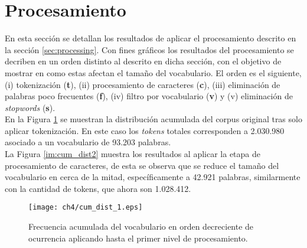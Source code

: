 \documentclass[letterpaper,12pt,oneside]{book} %
\begin{document}


\section{Procesamiento}

En esta sección se detallan los resultados de aplicar el procesamiento descrito en la sección \ref{sec:processing}. Con fines gráficos los resultados del procesamiento se decriben en un orden distinto al descrito en dicha sección, con el objetivo de mostrar en como estas afectan el tamaño del vocabulario. El orden es el siguiente, (i) tokenización (\textbf{t}), (ii) procesamiento de caracteres (\textbf{c}), (iii) eliminación de palabras poco frecuentes (\textbf{f}), (iv) filtro por vocabulario (\textbf{v}) y (v) eliminación de \textit{stopwords} (\textbf{s}).\\

En la Figura \ref{img:cum_dist1} se muestran la distribución acumulada del corpus original tras solo aplicar tokenización. En este caso los \textit{tokens} totales corresponden a 2.030.980 asociado a un vocabulario de 93.203 palabras.\\

La Figura \ref{im:cum_dist2} muestra los resultados al aplicar la etapa de procesamiento de caracteres, de esta se observa que se reduce el tamaño del vocabulario en cerca de la mitad, específicamente a 42.921 palabras, similarmente con la cantidad de tokens, que ahora son 1.028.412.

\begin{figure}
    \centering
    \texttt{[image: ch4/cum\_dist\_1.eps]}
    \caption{Frecuencia acumulada del vocabulario en orden decreciente de ocurrencia aplicando hasta el primer nivel de procesamiento.}
    \label{img:cum_dist1}
\end{figure}
\end{document}
